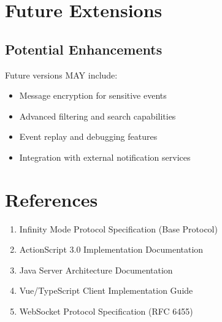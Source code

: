 \documentclass[12pt,a4paper]{article}
\begin{document}
\section{Future Extensions}

\subsection{Potential Enhancements}

Future versions MAY include:

\begin{itemize}
\item Message encryption for sensitive events
\item Advanced filtering and search capabilities
\item Event replay and debugging features
\item Integration with external notification services
\end{itemize}

\section{References}

\begin{enumerate}
\item Infinity Mode Protocol Specification (Base Protocol)
\item ActionScript 3.0 Implementation Documentation
\item Java Server Architecture Documentation
\item Vue/TypeScript Client Implementation Guide
\item WebSocket Protocol Specification (RFC 6455)
\end{enumerate}
\end{document}
